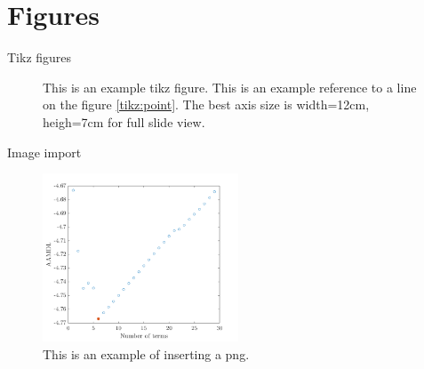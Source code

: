 \documentclass[mathserif,11pt]{beamer}
\begin{document}
\section{Figures}
\begin{frame}{Tikz figures}
\begin{figure}
	\centering
	
	\caption{This is an example tikz figure. This is an example reference to a line on the figure \ref{tikz:point}. The best axis size is width=12cm, heigh=7cm for full slide view.}
\end{figure}
\end{frame}
\begin{frame}{Image import}
\begin{figure}
	\centering
	\includegraphics[height=5cm]{Figures/example_figure.png}
	\caption{This is an example of inserting a png.}
\end{figure}
\end{frame}
\end{document}
